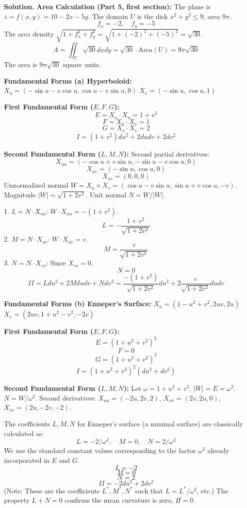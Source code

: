 \documentclass[12pt, a4paper, oneside]{article}
\newenvironment{solution}
  {\par\noindent\textbf{Solution. }\newline}
  {\par}
\begin{document}
\begin{solution}
\textbf{Area Calculation (Part 5, first section):}
The plane is $z = f(x, y) = 10 - 2x - 5y$. The domain $U$ is the disk $x^2+y^2 \le 9$, area $9\pi$.
$$f_x = -2, \quad f_y = -5$$The area density $\sqrt{1 + f_x^2 + f_y^2} = \sqrt{1 + (-2)^2 + (-5)^2} = \sqrt{30}$.$$A = \iint_{U} \sqrt{30} dx dy = \sqrt{30} \cdot \text{Area}(U) = 9\pi \sqrt{30}$$
The area is $9\pi \sqrt{30}$ square units.

\textbf{Fundamental Forms (a) Hyperboloid:}
$X_u = (-\sin u - v \cos u, \cos u - v \sin u, 0)$
$X_v = (-\sin u, \cos u, 1)$

\textbf{First Fundamental Form ($E, F, G$):}
$$E = X_u \cdot X_u = 1 + v^2$$$$F = X_u \cdot X_v = 1$$$$G = X_v \cdot X_v = 2$$
$$I = (1+v^2) du^2 + 2 du dv + 2 dv^2$$

\textbf{Second Fundamental Form ($L, M, N$):}
Second partial derivatives:
$$X_{uu} = (-\cos u + v \sin u, -\sin u - v \cos u, 0)$$$$X_{uv} = (-\sin u, \cos u, 0)$$$$X_{vv} = (0, 0, 0)$$
Unnormalized normal $W = X_u \times X_v = (\cos u - v \sin u, \sin u + v \cos u, -v)$.
Magnitude $|W| = \sqrt{1+2v^2}$. Unit normal $N = W/|W|$.

1.  $L = N \cdot X_{uu}$: $W \cdot X_{uu} = - (1 + v^2)$.
    $$L = -\frac{1+v^2}{\sqrt{1+2v^2}}$$
2.  $M = N \cdot X_{uv}$: $W \cdot X_{uv} = v$.
    $$M = \frac{v}{\sqrt{1+2v^2}}$$
3.  $N = N \cdot X_{vv}$: Since $X_{vv} = 0$,
    $$N = 0$$
$$II = L du^2 + 2M du dv + N dv^2 = \frac{- (1+v^2)}{\sqrt{1+2v^2}} du^2 + 2 \frac{v}{\sqrt{1+2v^2}} du dv$$

\textbf{Fundamental Forms (b) Enneper's Surface:}
$X_u = (1-u^2+v^2, 2uv, 2u)$
$X_v = (2uv, 1+u^2-v^2, -2v)$

\textbf{First Fundamental Form ($E, F, G$):}
$$E = (1+u^2+v^2)^2$$$$F = 0$$$$G = (1+u^2+v^2)^2$$
$$I = (1+u^2+v^2)^2 (du^2 + dv^2)$$

\textbf{Second Fundamental Form ($L, M, N$):}
Let $\omega = 1+u^2+v^2$. $|W| = E = \omega^2$. $N = W/\omega^2$.
Second derivatives: $X_{uu} = (-2u, 2v, 2)$, $X_{uv} = (2v, 2u, 0)$, $X_{vv} = (2u, -2v, -2)$.

The coefficients $L, M, N$ for Enneper's surface (a minimal surface) are classically calculated as:
$$L = -2/\omega^2, \quad M = 0, \quad N = 2/\omega^2$$
We use the standard constant values corresponding to the factor $\omega^2$ already incorporated in $E$ and $G$.
$$L = -2$$$$M = 0$$$$N = 2$$
$$II = -2 du^2 + 2 dv^2$$
(Note: These are the coefficients $L^*, M^*, N^*$ such that $L = L^* / \omega^2$, etc.) The property $L+N=0$ confirms the mean curvature is zero, $H=0$.
\end{solution}
\end{document}

